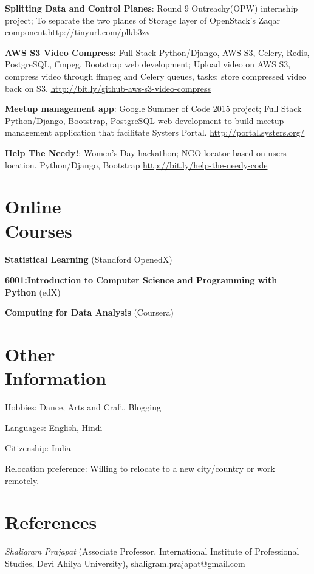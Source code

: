 \documentclass[margin,line]{resume}
\begin{document}
\begin{resume}
\begin{list2}
    \item \textbf{Splitting Data and Control Planes}: Round 9 Outreachy(OPW) internship project; To separate the two planes of Storage layer of OpenStack's Zaqar component.\url{http://tinyurl.com/plkb3zv}
    \item \textbf{AWS S3 Video Compress}: Full Stack Python/Django, AWS S3, Celery, Redis, PostgreSQL, ffmpeg, Bootstrap web development; Upload video on AWS S3, compress video through ffmpeg and Celery queues, tasks; store compressed video back on S3. \url{http://bit.ly/github-aws-s3-video-compress}
    \item \textbf{Meetup management app}: Google Summer of Code 2015 project; Full Stack Python/Django, Bootstrap, PostgreSQL web development to build meetup management application that facilitate Systers Portal. \url{http://portal.systers.org/}	
    \item \textbf{Help The Needy!}: Women's Day hackathon; NGO locator based on users location. Python/Django, Bootstrap \url{http://bit.ly/help-the-needy-code}
    \end{list2}

    \section{\mysidestyle Online \\ Courses}

    \begin{list2}
	\item \textbf{Statistical Learning} (Standford OpenedX)
	\item \textbf{6001:Introduction to Computer Science and Programming with Python} (edX)
	\item \textbf{Computing for Data Analysis} (Coursera)
	\end{list2}

    \section{\mysidestyle Other \\ Information}
    \begin{list2}
    \item Hobbies: Dance, Arts and Craft, Blogging
    \item Languages: English, Hindi
    \item Citizenship: India
    \item Relocation preference: Willing to relocate to a new city/country or work remotely.   
    \end{list2}
    \section{\mysidestyle References} 

    \begin{list2}
    \item {\sl Shaligram Prajapat} (Associate Professor, International Institute of Professional Studies, Devi Ahilya University), shaligram.prajapat@gmail.com
    \end{list2}

\end{resume}
\end{document}
